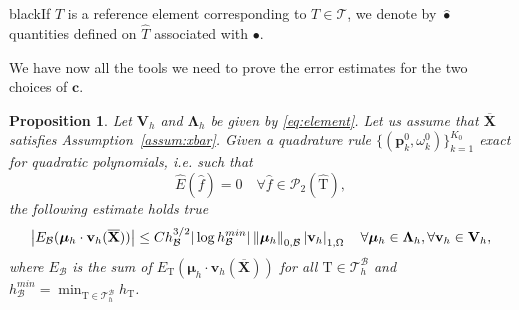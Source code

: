 \documentclass[oneside]{amsart} %
\newcommand{\norm}[1]{\left\lVert#1\right\rVert}
\newcommand{\abs}[1]{\left\lvert#1\right\rvert}
\newtheorem{prop}{Proposition}
\newcommand\B{\mathcal B} %
\renewcommand\v{\mathbf{v}} %
\renewcommand\c{\mathbf{c}} %
\newcommand\X{\mathbf{X}} %
\newcommand\Xbar{\overline{\X}} %
\newcommand\LL{{\boldsymbol{\Lambda}}} %
\newcommand\Vline{\mathbf{V}} %
\newcommand\mmu{{\boldsymbol\mu}} %
\newcommand\T{\mathcal{T}} %
\newcommand\quadnode{\mathbf{p}}
\newcommand\quadweigth{\omega}
\newcommand\Pcal{\mathcal{P}}
\newcommand\tri{\mathrm{T}} %
\newcommand\reftri{\widehat{\tri}} %
\newcommand\DB{\begin{color}{black}}
\newcommand\BD{\end{color}}
\begin{document}
	\DB If $\widehat T$ is a reference element corresponding to $T\in\T$, we
	denote by $\widehat\bullet$ quantities defined on $\widehat T$ associated with
	$\bullet$.\BD
	
	We have now all the tools we need to prove the error estimates for the two choices of $\c$.
	
	
	\begin{prop}\label{prop:l2_quad_error}
		Let $\Vline_h$ and $\LL_h$ be given by \eqref{eq:element}. Let us assume that $\Xbar$ satisfies Assumption~\ref{assum:xbar}.
		Given a quadrature rule $\{(\quadnode_k^0,\quadweigth_k^0)\}_{k=1}^{K_0}$ exact for quadratic polynomials, i.e. such that
		\begin{equation}\label{eq:quadr}
			\widehat{E}(\widehat{f}) = 0 \quad\forall\widehat{f}\in\Pcal_2(\reftri),
		\end{equation}
		the following estimate holds true %
		\begin{equation}\label{eq:l2_quad_error}
			\abs{E_\B(\mmu_h\cdot\v_h(\Xbar))}
			\le
			C h_\B^{3/2}|\log h_\B^{min}|
			\norm{\mmu_h}_{0,\B}\DB\abs{\v_h}_{1,\Omega}\BD
			\quad\forall\mmu_h\in\LL_h,\forall\v_h\in\Vline_h,
		\end{equation}
		where $E_\B$ is the sum of $E_\tri(\mmu_h\cdot\v_h(\Xbar))$ for all $\tri\in\T_h^\B$ and  $h_\B^{min}=\min_{\tri\in\T_h^\B} h_\tri$. 
	\end{prop}
	
\end{document}
